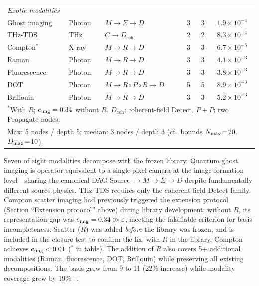 \begin{table}[h]
\begin{tabular}{@{}llllcc@{}}
\midrule
\multicolumn{6}{l}{\textit{Exotic modalities}} \\
Ghost imaging    & Photon   & $M \!\to\! \Sigma \!\to\! D$              & 3 & 3 & $1.9 \times 10^{-4}$ \\
THz-TDS          & THz      & $C \!\to\! D_{\mathrm{coh}}$              & 2 & 2 & $8.3 \times 10^{-4}$ \\
Compton$^{*}$    & X-ray    & $M \!\to\! R \!\to\! D$                   & 3 & 3 & $6.7 \times 10^{-3}$ \\
Raman            & Photon   & $M \!\to\! R \!\to\! D$                   & 3 & 3 & $4.1 \times 10^{-3}$ \\
Fluorescence     & Photon   & $M \!\to\! R \!\to\! D$                   & 3 & 3 & $3.8 \times 10^{-3}$ \\
DOT              & Photon   & $M \!\to\! R \!\circ\! P \!\circ\! R \!\to\! D$ & 5 & 5 & $8.9 \times 10^{-3}$ \\
Brillouin        & Photon   & $M \!\to\! R \!\to\! D$                   & 3 & 3 & $5.2 \times 10^{-3}$ \\
\bottomrule
\multicolumn{6}{l}{\footnotesize $^{*}$With $R$; $e_{\mathrm{img}} = 0.34$ without $R$. $D_{\mathrm{coh}}$: coherent-field Detect. $P{+}P$: two Propagate nodes.}\\
\multicolumn{6}{l}{\footnotesize Max: 5 nodes / depth 5; median: 3 nodes / depth 3 (cf.\ bounds $N_{\max}\!=\!20$, $D_{\max}\!=\!10$).}
\end{tabular}
\end{table}

\noindent Seven of eight modalities decompose with the frozen library. Quantum ghost imaging is operator-equivalent to a single-pixel camera at the image-formation level---sharing the canonical DAG Source $\to M \to \Sigma \to D$ despite fundamentally different source physics. THz-TDS requires only the coherent-field Detect family. Compton scatter imaging had previously triggered the extension protocol (Section ``Extension protocol'' above) during library development: without $R$, its representation gap was $e_{\mathrm{img}} = 0.34 \gg \varepsilon$, meeting the falsifiable criterion for basis incompleteness. Scatter ($R$) was added \emph{before} the library was frozen, and is included in the closure test to confirm the fix: with $R$ in the library, Compton achieves $e_{\mathrm{img}} < 0.01$ ($^*$ in table). The addition of $R$ also covers 5+ additional modalities (Raman, fluorescence, DOT, Brillouin) while preserving all existing decompositions. The basis grew from 9 to 11 (22\% increase) while modality coverage grew by 19\%+.

